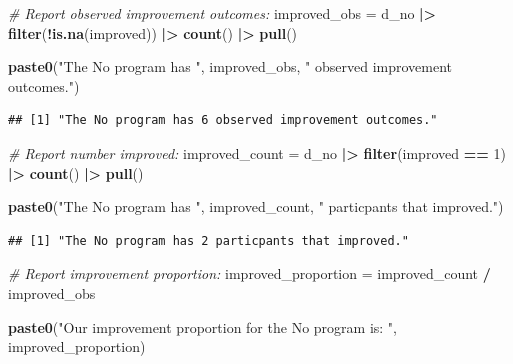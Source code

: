 \documentclass[
]{article}
\newenvironment{Shaded}{\begin{snugshade}}{\end{snugshade}}
\newcommand{\CommentTok}[1]{\textcolor[rgb]{0.56,0.35,0.01}{\textit{#1}}}
\newcommand{\DecValTok}[1]{\textcolor[rgb]{0.00,0.00,0.81}{#1}}
\newcommand{\FunctionTok}[1]{\textcolor[rgb]{0.13,0.29,0.53}{\textbf{#1}}}
\newcommand{\NormalTok}[1]{#1}
\newcommand{\OtherTok}[1]{\textcolor[rgb]{0.56,0.35,0.01}{#1}}
\newcommand{\SpecialCharTok}[1]{\textcolor[rgb]{0.81,0.36,0.00}{\textbf{#1}}}
\newcommand{\StringTok}[1]{\textcolor[rgb]{0.31,0.60,0.02}{#1}}
\begin{document}
\begin{Shaded}
\begin{Highlighting}[]
\CommentTok{\# Report observed improvement outcomes:}
\NormalTok{improved\_obs }\OtherTok{=}\NormalTok{ d\_no }\SpecialCharTok{|\textgreater{}} 
  \FunctionTok{filter}\NormalTok{(}\SpecialCharTok{!}\FunctionTok{is.na}\NormalTok{(improved)) }\SpecialCharTok{|\textgreater{}} 
  \FunctionTok{count}\NormalTok{() }\SpecialCharTok{|\textgreater{}} 
  \FunctionTok{pull}\NormalTok{()}

\FunctionTok{paste0}\NormalTok{(}\StringTok{"The No program has "}\NormalTok{, improved\_obs, }\StringTok{" observed improvement outcomes."}\NormalTok{)}
\end{Highlighting}
\end{Shaded}

\begin{verbatim}
## [1] "The No program has 6 observed improvement outcomes."
\end{verbatim}

\begin{Shaded}
\begin{Highlighting}[]
\CommentTok{\# Report number improved:}
\NormalTok{improved\_count }\OtherTok{=}\NormalTok{ d\_no }\SpecialCharTok{|\textgreater{}} 
  \FunctionTok{filter}\NormalTok{(improved }\SpecialCharTok{==} \DecValTok{1}\NormalTok{) }\SpecialCharTok{|\textgreater{}} 
  \FunctionTok{count}\NormalTok{() }\SpecialCharTok{|\textgreater{}} 
  \FunctionTok{pull}\NormalTok{()}

\FunctionTok{paste0}\NormalTok{(}\StringTok{"The No program has "}\NormalTok{, improved\_count, }\StringTok{" particpants that improved."}\NormalTok{)}
\end{Highlighting}
\end{Shaded}

\begin{verbatim}
## [1] "The No program has 2 particpants that improved."
\end{verbatim}

\begin{Shaded}
\begin{Highlighting}[]
\CommentTok{\# Report improvement proportion:}
\NormalTok{improved\_proportion }\OtherTok{=}\NormalTok{ improved\_count }\SpecialCharTok{/}\NormalTok{ improved\_obs }

\FunctionTok{paste0}\NormalTok{(}\StringTok{"Our improvement proportion for the No program is: "}\NormalTok{, improved\_proportion)}
\end{Highlighting}
\end{Shaded}
\end{document}
